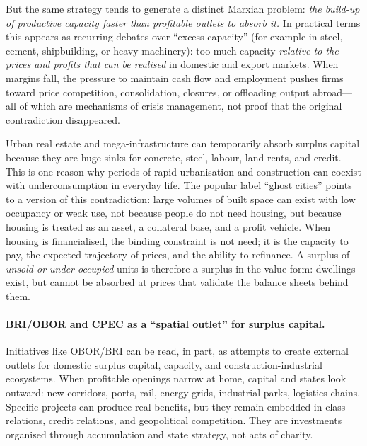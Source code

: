 But the same strategy tends to generate a distinct Marxian problem:
\emph{the build-up of productive capacity faster than profitable outlets to absorb it.}
In practical terms this appears as recurring debates over “excess capacity” (for example in
steel, cement, shipbuilding, or heavy machinery): too much capacity \emph{relative to the
prices and profits that can be realised} in domestic and export markets.\cite{OECDSteel}
When margins fall, the pressure to maintain cash flow and employment pushes firms toward
price competition, consolidation, closures, or offloading output abroad---all of which are
mechanisms of crisis management, not proof that the original contradiction disappeared.

Urban real estate and mega-infrastructure can temporarily absorb surplus capital because
they are huge sinks for concrete, steel, labour, land rents, and credit.
This is one reason why periods of rapid urbanisation and construction can coexist with
underconsumption in everyday life.
The popular label “ghost cities” points to a version of this contradiction:
large volumes of built space can exist with low occupancy or weak use,
not because people do not need housing, but because housing is treated as an asset,
a collateral base, and a profit vehicle.
When housing is financialised, the binding constraint is not need; it is the capacity to pay,
the expected trajectory of prices, and the ability to refinance.
A surplus of \emph{unsold or under-occupied} units is therefore a surplus in the value-form:
dwellings exist, but cannot be absorbed at prices that validate the balance sheets behind them.

\paragraph{BRI/OBOR and CPEC as a “spatial outlet” for surplus capital.}
Initiatives like OBOR/BRI can be read, in part, as attempts to create external outlets for
domestic surplus capital, capacity, and construction-industrial ecosystems.
When profitable openings narrow at home, capital and states look outward:
new corridors, ports, rail, energy grids, industrial parks, logistics chains.\cite{CarmodyTaylorZajontz2021}
Specific projects can produce real benefits, but they remain embedded in
class relations, credit relations, and geopolitical competition. They are
investments organised through accumulation and state strategy, not acts of
charity.


